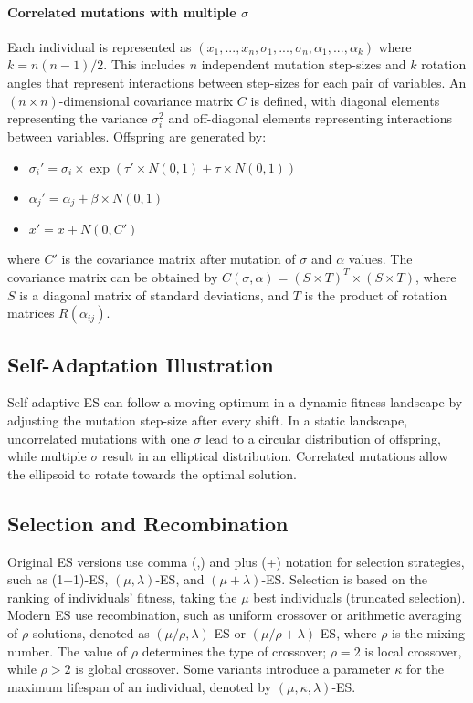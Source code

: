 \paragraph*{Correlated mutations with multiple $\sigma$} Each individual is represented as $(x_1, ..., x_n, \sigma_1, ..., \sigma_n, \alpha_1, ..., \alpha_k)$ where $k = n(n-1)/2$. This includes $n$ independent mutation step-sizes and $k$ rotation angles that represent interactions between step-sizes for each pair of variables. An $(n \times n)$-dimensional covariance matrix $C$ is defined, with diagonal elements representing the variance $\sigma_i^2$ and off-diagonal elements representing interactions between variables. Offspring are generated by:
\begin{itemize}
    \item $\sigma_i' = \sigma_i \times \exp(\tau' \times N(0,1) + \tau \times N(0,1))$
    \item $\alpha_j' = \alpha_j + \beta \times N(0,1)$
    \item $x' = x + N(0, C')$
\end{itemize}
where $C'$ is the covariance matrix after mutation of $\sigma$ and $\alpha$ values. The covariance matrix can be obtained by $C(\sigma, \alpha) = (S \times T)^T \times (S \times T)$, where $S$ is a diagonal matrix of standard deviations, and $T$ is the product of rotation matrices $R(\alpha_{ij})$.

\subsection*{Self-Adaptation Illustration}
Self-adaptive ES can follow a moving optimum in a dynamic fitness landscape by adjusting the mutation step-size after every shift. In a static landscape, uncorrelated mutations with one $\sigma$ lead to a circular distribution of offspring, while multiple $\sigma$ result in an elliptical distribution. Correlated mutations allow the ellipsoid to rotate towards the optimal solution.

\subsection*{Selection and Recombination}
Original ES versions use comma (,) and plus (+) notation for selection strategies, such as (1+1)-ES, $(\mu, \lambda)$-ES, and $(\mu+\lambda)$-ES. Selection is based on the ranking of individuals' fitness, taking the $\mu$ best individuals (truncated selection). Modern ES use recombination, such as uniform crossover or arithmetic averaging of $\rho$ solutions, denoted as $(\mu/\rho,\lambda)$-ES or $(\mu/\rho+\lambda)$-ES, where $\rho$ is the mixing number. The value of $\rho$ determines the type of crossover; $\rho = 2$ is local crossover, while $\rho > 2$ is global crossover. Some variants introduce a parameter $\kappa$ for the maximum lifespan of an individual, denoted by $(\mu, \kappa, \lambda)$-ES.
